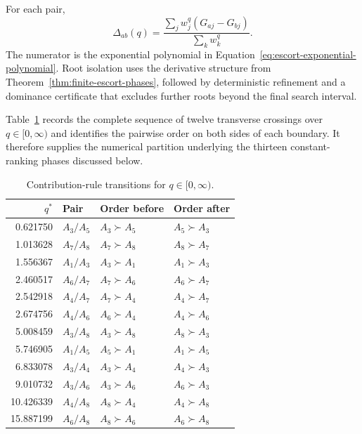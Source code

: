 \documentclass[reqno,11pt]{amsart}
\theoremstyle{definition}
\theoremstyle{plain}
\theoremstyle{remark}
\begin{document}
For each pair,
\[
\Delta_{ab}(q)
=
\frac{\sum_j w_j^q(G_{aj}-G_{bj})}{\sum_kw_k^q}.
\]
The numerator is the exponential polynomial in Equation~\eqref{eq:escort-exponential-polynomial}. Root isolation uses the derivative structure from Theorem~\ref{thm:finite-escort-phases}, followed by deterministic refinement and a dominance certificate that excludes further roots beyond the final search interval.

Table~\ref{tab:escort-transitions} records the complete sequence of twelve transverse crossings over $q\in[0,\infty)$ and identifies the pairwise order on both sides of each boundary. It therefore supplies the numerical partition underlying the thirteen constant-ranking phases discussed below.

\begin{table}[htbp]
\centering
\scriptsize
\caption{Contribution-rule transitions for $q\in[0,\infty)$.}
\label{tab:escort-transitions}
\begin{tabular}{rlll}
\toprule
$q^*$ & Pair & Order before & Order after\\
\midrule
0.621750 & $A_3/A_5$ & $A_3\succ A_5$ & $A_5\succ A_3$\\
1.013628 & $A_7/A_8$ & $A_7\succ A_8$ & $A_8\succ A_7$\\
1.556367 & $A_1/A_3$ & $A_3\succ A_1$ & $A_1\succ A_3$\\
2.460517 & $A_6/A_7$ & $A_7\succ A_6$ & $A_6\succ A_7$\\
2.542918 & $A_4/A_7$ & $A_7\succ A_4$ & $A_4\succ A_7$\\
2.674756 & $A_4/A_6$ & $A_6\succ A_4$ & $A_4\succ A_6$\\
5.008459 & $A_3/A_8$ & $A_3\succ A_8$ & $A_8\succ A_3$\\
5.746905 & $A_1/A_5$ & $A_5\succ A_1$ & $A_1\succ A_5$\\
6.833078 & $A_3/A_4$ & $A_3\succ A_4$ & $A_4\succ A_3$\\
9.010732 & $A_3/A_6$ & $A_3\succ A_6$ & $A_6\succ A_3$\\
10.426339 & $A_4/A_8$ & $A_8\succ A_4$ & $A_4\succ A_8$\\
15.887199 & $A_6/A_8$ & $A_8\succ A_6$ & $A_6\succ A_8$\\
\bottomrule
\end{tabular}
\end{table}
\end{document}
